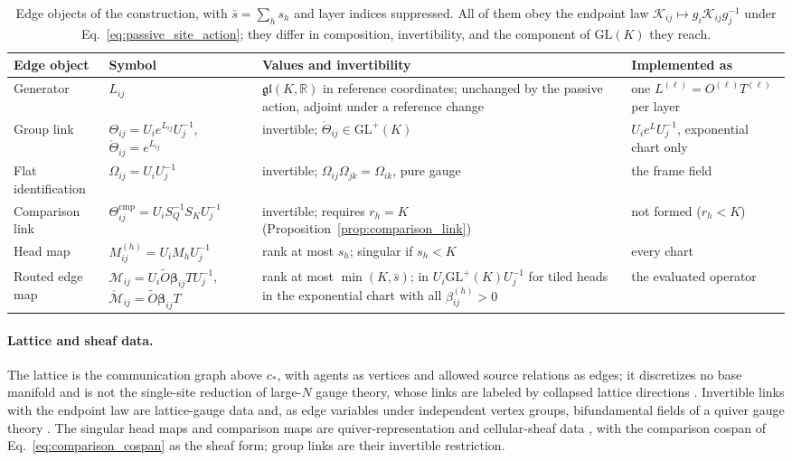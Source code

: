 \documentclass[twoside,11pt]{article}
\begin{document}
\begin{table}[tbp]
\centering
\small
\renewcommand{\arraystretch}{1.12}
\begin{tabularx}{\textwidth}{@{}>{\raggedright\arraybackslash}p{2.1cm}>{\raggedright\arraybackslash}p{3.5cm}>{\raggedright\arraybackslash}X>{\raggedright\arraybackslash}p{2.5cm}@{}}
\toprule
Edge object & Symbol & Values and invertibility & Implemented as \\
\midrule
Generator & $L_{ij}$ & $\mathfrak{gl}(K,\mathbb R)$ in reference coordinates; unchanged by the passive action, adjoint under a reference change & one $L^{(\ell)}=O^{(\ell)}T^{(\ell)}$ per layer \\
Group link & $\Theta_{ij}=U_ie^{L_{ij}}U_j^{-1}$, $\mathring\Theta_{ij}=e^{L_{ij}}$ & invertible; $\mathring\Theta_{ij}\in\mathrm{GL}^+(K)$ & $U_ie^{L}U_j^{-1}$, exponential chart only \\
Flat identification & $\Omega_{ij}=U_iU_j^{-1}$ & invertible; $\Omega_{ij}\Omega_{jk}=\Omega_{ik}$, pure gauge & the frame field \\
Comparison link & $\Theta^{\mathrm{cmp}}_{ij}=U_iS_Q^{-1}S_KU_j^{-1}$ & invertible; requires $r_h=K$ (Proposition~\ref{prop:comparison_link}) & not formed ($r_h<K$) \\
Head map & $M^{(h)}_{ij}=U_iM_hU_j^{-1}$ & rank at most $s_h$; singular if $s_h<K$ & every chart \\
Routed edge map & $\mathcal M_{ij}=U_i\widetilde O\boldsymbol\beta_{ij}TU_j^{-1}$, $\mathring{\mathcal M}_{ij}=\widetilde O\boldsymbol\beta_{ij}T$ & rank at most $\min(K,\bar s)$; in $U_i\mathrm{GL}^+(K)U_j^{-1}$ for tiled heads in the exponential chart with all $\beta^{(h)}_{ij}>0$ & the evaluated operator \\
\bottomrule
\end{tabularx}
\caption{Edge objects of the construction, with $\bar s=\sum_hs_h$ and layer indices suppressed. All of them obey the endpoint law $\mathcal K_{ij}\mapsto g_i\mathcal K_{ij}g_j^{-1}$ under Eq.~\eqref{eq:passive_site_action}; they differ in composition, invertibility, and the component of $\mathrm{GL}(K)$ they reach.}
\label{tab:link_conventions}
\end{table}

\paragraph{Lattice and sheaf data.}
The lattice is the communication graph above $c_*$, with agents as vertices and allowed source relations as edges; it discretizes no base manifold and is not the single-site reduction of large-$N$ gauge theory, whose links are labeled by collapsed lattice directions \citep{EguchiKawai1982}. Invertible links with the endpoint law are lattice-gauge data \citep{WilsonConfinement1974,Kogut1979RMP,Creutz1983} and, as edge variables under independent vertex groups, bifundamental fields of a quiver gauge theory \citep{DouglasMoore1996Quivers}. The singular head maps and comparison maps are quiver-representation and cellular-sheaf data \citep{King1994Quiver,HansenGhrist2019}, with the comparison cospan of Eq.~\eqref{eq:comparison_cospan} as the sheaf form; group links are their invertible restriction.
\end{document}

